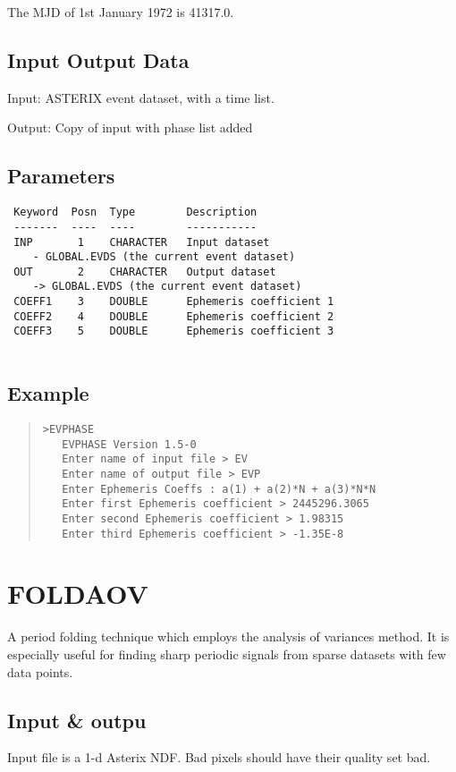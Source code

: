 \documentclass{book}
\renewcommand{\_}{{\tt\char'137}}     %
\begin{document}
The MJD of 1st January 1972 is 41317.0.
 
\subsection{Input Output Data}
Input: ASTERIX event dataset, with a time list.
 
Output: Copy of input with phase list added
 
\subsection{Parameters}
\begin{verbatim}
 Keyword  Posn  Type        Description
 -------  ----  ----        -----------
 INP       1    CHARACTER   Input dataset
    - GLOBAL.EVDS (the current event dataset)
 OUT       2    CHARACTER   Output dataset
    -> GLOBAL.EVDS (the current event dataset)
 COEFF1    3    DOUBLE      Ephemeris coefficient 1
 COEFF2    4    DOUBLE      Ephemeris coefficient 2
 COEFF3    5    DOUBLE      Ephemeris coefficient 3
 
\end{verbatim}\subsection{Example}
\begin{quote}\begin{verbatim}
>EVPHASE
   EVPHASE Version 1.5-0
   Enter name of input file > EV
   Enter name of output file > EVP
   Enter Ephemeris Coeffs : a(1) + a(2)*N + a(3)*N*N
   Enter first Ephemeris coefficient > 2445296.3065
   Enter second Ephemeris coefficient > 1.98315
   Enter third Ephemeris coefficient > -1.35E-8
\end{verbatim}\end{quote}
\section{FOLDAOV}
A period folding technique which employs the analysis of variances
method. It is especially useful for finding sharp periodic signals
from sparse datasets with few data points.
 
\subsection{Input \& outpu}
Input file is a 1-d Asterix NDF. Bad pixels should have their quality
set bad.
 
\end{document}
